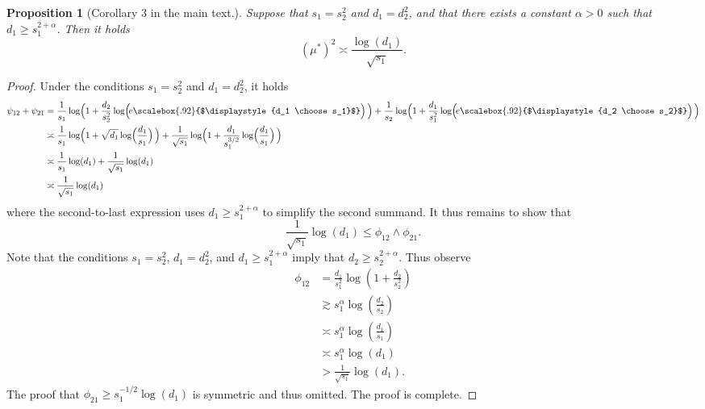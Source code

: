 \documentclass{article}
\newtheorem{proposition}{Proposition}
\theoremstyle{remark}
\begin{document}
    \begin{proposition}[Corollary 3 in the main text.]
        Suppose that $s_1 = s_2^2$ and $d_1 = d_2^2$, and that there exists a constant $\alpha > 0$ such that $d_1 \geq s_1^{2 + \alpha}$. Then it holds
       \begin{equation}
            (\mu^*)^2 \asymp \frac{\log \left(d_1\right)}{\sqrt{s_1}}.
        \end{equation}
    \end{proposition}
    \begin{proof}
        Under the conditions $s_1 = s_2^2$ and $d_1 = d_2^2$, it holds
        \begin{align*}
            \psi_{12} + \psi_{21} &= \frac{1}{s_1} \log\!\Big(1+ \frac{d_2}{s_2^2} \log\!\Big(\!e\scalebox{.92}{$\displaystyle{d_1 \choose s_1}$}\Big)\,\Big) + \frac{1}{s_2} \log\!\Big(1+ \frac{d_1}{s_1^2} \log\!\Big(\!e\scalebox{.92}{$\displaystyle{d_2 \choose s_2}$}\Big)\,\Big) \\
            &\asymp \frac{1}{s_1} \log\!\Big(1+ \sqrt{d_1}\log\!\Big(\frac{d_1}{s_1}\Big)\,\Big) + \frac{1}{\sqrt{s_1}} \log\!\Big(1+ \frac{d_1}{s_1^{3/2}} \log\!\Big(\frac{d_1}{s_1}\Big)\,\Big) \\
            &\asymp \frac{1}{s_1} \log(d_1) + \frac{1}{\sqrt{s_1}} \log(d_1) \\
            &\asymp \frac{1}{\sqrt{s_1}} \log(d_1)
        \end{align*}
        where the second-to-last expression uses $d_1 \geq s_1^{2 + 
        \alpha}$ to simplify the second summand. It thus remains to show that 
        \[\frac{1}{\sqrt{s_1}} \log(d_1) \leq \phi_{12} \land \phi_{21}.\]
        Note that the conditions $s_1 = s_2^2$, $d_1 = d_2^2$, and $d_1 \geq s_1^{2 + \alpha}$ imply that $d_2 \geq s_2^{2 + \alpha}$. Thus observe
        \begin{align*}
            \phi_{12} &= \frac{d_1}{s_1^2}\log\left(1 + \frac{d_2}{s_2^2}\right) \\
            &\gtrsim  s_1^{\alpha}\log\left( \frac{d_2}{s_2}\right) \\
            &\asymp s_1^{\alpha}\log\left( \frac{d_1}{s_1}\right) \\
            &\asymp s_1^{\alpha}\log\left( d_1\right) \\
            &> \frac{1}{\sqrt{s_1}} \log(d_1).
        \end{align*}
        The proof that $\phi_{21} \geq s_1^{-1/2}\log(d_1)$ is symmetric and thus omitted. The proof is complete.
    \end{proof}
\end{document}
